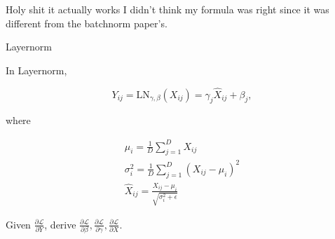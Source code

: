 \documentclass[answers]{exam}
\begin{document}
\begin{questions}
\begin{parts}
\begin{solution}
Holy shit it actually works I didn't think my formula was right since it was
different from the batchnorm paper's.
\end{solution}
\end{parts}

\question[15] Layernorm

In Layernorm,

\[
Y_{ij} = \text{LN}_{\gamma,\beta}(X_{ij}) = \gamma_{j}\hat{X}_{ij} + \beta_{j}
,\] 

where

\begin{gather*}
\mu_{i} = \frac{1}{D} \sum_{j=1}^{D}X_{ij} \\ 
\sigma_{i}^2 = \frac{1}{D} \sum_{j=1}^{D} (X_{ij}-\mu_{i})^2 \\
\hat{X}_{ij} = \frac{X_{ij} - \mu_{i}}{\sqrt{\sigma_{i}^2+\epsilon}}
\end{gather*}

Given $\frac{\partial \mathcal{L}}{\partial Y}$, derive 
$\frac{\partial \mathcal{L}}{\partial \beta},
\frac{\partial \mathcal{L}}{\partial \gamma}, 
\frac{\partial \mathcal{L}}{\partial X}$.

\end{questions}
\end{document}
